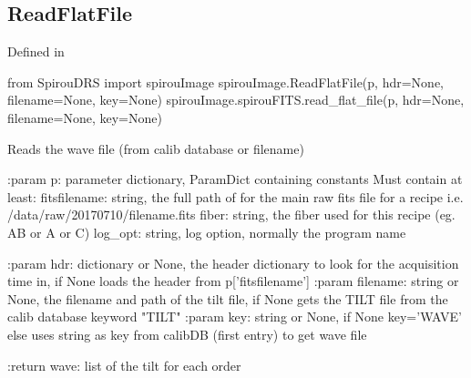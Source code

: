 
\noindent\begin{minipage}{\textwidth}
\subsection{ReadFlatFile}

Defined in \spirouImage{}

\begin{pythonbox}
from SpirouDRS import spirouImage
spirouImage.ReadFlatFile(p, hdr=None, filename=None, key=None)
spirouImage.spirouFITS.read_flat_file(p, hdr=None, filename=None, key=None)
\end{pythonbox}

\begin{pythondocstring}
Reads the wave file (from calib database or filename)

:param p: parameter dictionary, ParamDict containing constants
    Must contain at least:
            fitsfilename: string, the full path of for the main raw fits
                          file for a recipe
                          i.e. /data/raw/20170710/filename.fits
            fiber: string, the fiber used for this recipe (eg. AB or A or C)
            log_opt: string, log option, normally the program name

:param hdr: dictionary or None, the header dictionary to look for the
                 acquisition time in, if None loads the header from
                 p['fitsfilename']
:param filename: string or None, the filename and path of the tilt file,
                 if None gets the TILT file from the calib database
                 keyword "TILT"
:param key: string or None, if None key='WAVE' else uses string as key
            from calibDB (first entry) to get wave file

:return wave: list of the tilt for each order
\end{pythondocstring}
\end{minipage}


